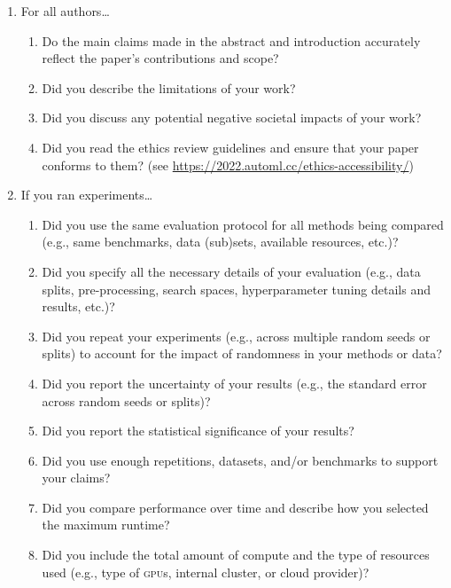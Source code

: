 \documentclass[11pt]{article}
\begin{document}
\begin{enumerate}
\item For all authors\dots
  \begin{enumerate}
  \item Do the main claims made in the abstract and introduction accurately
    reflect the paper's contributions and scope?
    \answerTODO{}
  \item Did you describe the limitations of your work?
    \answerTODO{}
  \item Did you discuss any potential negative societal impacts of your work?
    \answerTODO{}
  \item Did you read the ethics review guidelines and ensure that your paper
    conforms to them? (see \url{https://2022.automl.cc/ethics-accessibility/})
    \answerTODO{}
  \end{enumerate}
\item If you ran experiments\dots
  \begin{enumerate}
  \item Did you use the same evaluation protocol for all methods being compared (e.g.,
    same benchmarks, data (sub)sets, available resources, etc.)?
    \answerTODO{}
  \item Did you specify all the necessary details of your evaluation (e.g., data splits,
    pre-processing, search spaces, hyperparameter tuning details and results, etc.)?
    \answerTODO{}
  \item Did you repeat your experiments (e.g., across multiple random seeds or
    splits) to account for the impact of randomness in your methods or data?
    \answerTODO{}
  \item Did you report the uncertainty of your results (e.g., the standard error
    across random seeds or splits)?
    \answerTODO{}
  \item Did you report the statistical significance of your results?
    \answerTODO{}
  \item Did you use enough repetitions, datasets, and/or benchmarks to support
    your claims?
    \answerTODO{}
  \item Did you compare performance over time and describe how you selected the
    maximum runtime?
    \answerTODO{}
  \item Did you include the total amount of compute and the type of resources
    used (e.g., type of \textsc{gpu}s, internal cluster, or cloud provider)?

\end{enumerate}
\end{enumerate}
\end{document}
